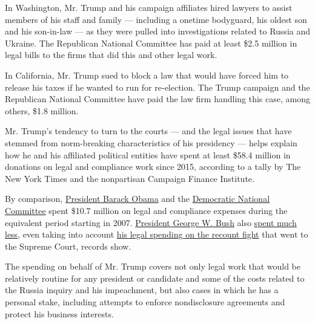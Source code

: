 In Washington, Mr. Trump and his campaign affiliates hired lawyers to
assist members of his staff and family --- including a onetime
bodyguard, his oldest son and his son-in-law --- as they were pulled
into investigations related to Russia and Ukraine. The Republican
National Committee has paid at least \$2.5 million in legal bills to the
firms that did this and other legal work.

In California, Mr. Trump sued to block a law that would have forced him
to release his taxes if he wanted to run for re-election. The Trump
campaign and the Republican National Committee have paid the law firm
handling this case, among others, \$1.8 million.

Mr. Trump's tendency to turn to the courts --- and the legal issues that
have stemmed from norm-breaking characteristics of his presidency ---
helps explain how he and his affiliated political entities have spent at
least \$58.4 million in donations on legal and compliance work since
2015, according to a tally by The New York Times and the nonpartisan
Campaign Finance Institute.

By comparison,
\href{https://www.fec.gov/data/disbursements/?data_type=processed\&committee_id=C00431445\&committee_id=C00451393\&committee_id=C00494740\&min_date=01\%2F01\%2F2007\&max_date=08\%2F30\%2F2012\&disbursement_description=compliance\&disbursement_description=legal}{President
Barack Obama} and the
\href{https://www.fec.gov/data/disbursements/?data_type=processed\&committee_id=C00010603\&two_year_transaction_period=2008\&two_year_transaction_period=2010\&two_year_transaction_period=2012\&two_year_transaction_period=2014\&min_date=07\%2F01\%2F2008\&max_date=12\%2F31\%2F2012\&disbursement_description=legal+\&disbursement_description=compliance}{Democratic
National Committee} spent \$10.7 million on legal and compliance
expenses during the equivalent period starting in 2007.
\href{https://transition.fec.gov/press/summaries/2000/tables/presidential/Pres2_2000_24m.pdf}{President
George W. Bush} also
\href{https://www.fec.gov/data/disbursements/?data_type=processed\&committee_id=C00343509\&committee_id=C00386987\&committee_id=C00388579\&committee_id=C00404343\&min_date=01\%2F01\%2F2001\&max_date=12\%2F31\%2F2004\&disbursement_description=compliance\&disbursement_description=legal}{spent
much less}, even taking into account
\href{http://www.politicalmoneyline.com/noaccess.aspx}{his legal
spending on the recount fight} that went to the Supreme Court, records
show.

The spending on behalf of Mr. Trump covers not only legal work that
would be relatively routine for any president or candidate and some of
the costs related to the Russia inquiry and his impeachment, but also
cases in which he has a personal stake, including attempts to enforce
nondisclosure agreements and protect his business interests.


